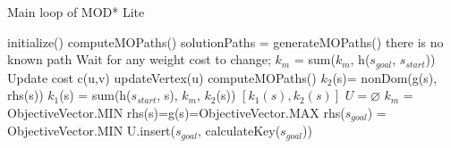 \documentclass[10pt,journal]{IEEEtran}
\begin{document}
\begin{algorithm}
	\caption{Main loop of MOD* Lite}
	\label{algMain}
	{\fontsize{9}{9}\selectfont
    \begin{algorithmic}[1] %
      	\State initialize()
      	\State computeMOPaths()
    	      	\State solutionPaths = generateMOPaths()
    	      	 there is no known path \EndIf
    	      	\State Wait for any weight cost to change;
    	      		\State $k_{m}$ = sum($k_{m}$, h($s_{goal}$, $s_{start}$))
    	      			\State Update cost c(u,v)
    	      			\State updateVertex(u)
    	      		\EndFor
		      	\State computeMOPaths()
    	      	\EndIf
		\EndWhile
  	  \EndFunction
      \Statex      
      	\State $k_{2}$(s)= nonDom(g(s), rhs(s))
      	\State $k_{1}$(s) = sum(h($s_{start}$, s), $k_{m}$, $k_{2}$(s))
      	\State \Return $[k_{1}(s), k_{2}(s)]$
      \EndFunction
   	  \Statex
      	\State $U = \varnothing $
      	\State $k_{m}$ = ObjectiveVector.MIN
     		\State rhs(s)=g(s)=ObjectiveVector.MAX
     	\EndFor
      	\State rhs($s_{goal}$) = ObjectiveVector.MIN
      	\State U.insert($s_{goal}$, calculateKey($s_{goal}$))
	  \EndFunction
    \end{algorithmic}}
\end{algorithm}
\end{document}

